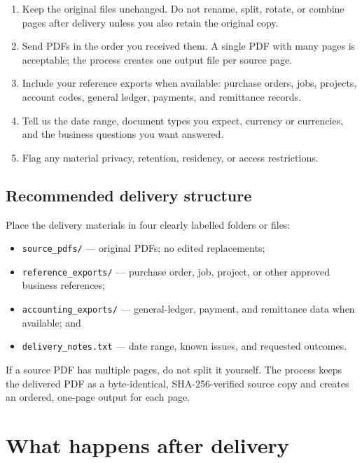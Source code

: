 \documentclass[
]{article}
\providecommand{\tightlist}{%
  \setlength{\itemsep}{0pt}\setlength{\parskip}{0pt}}
\begin{document}
\begin{enumerate}
\def\labelenumi{\arabic{enumi}.}
\tightlist
\item
  Keep the original files unchanged. Do not rename, split, rotate, or
  combine pages after delivery unless you also retain the original copy.
\item
  Send PDFs in the order you received them. A single PDF with many pages
  is acceptable; the process creates one output file per source page.
\item
  Include your reference exports when available: purchase orders, jobs,
  projects, account codes, general ledger, payments, and remittance
  records.
\item
  Tell us the date range, document types you expect, currency or
  currencies, and the business questions you want answered.
\item
  Flag any material privacy, retention, residency, or access
  restrictions.
\end{enumerate}

\subsection{Recommended delivery
structure}\label{recommended-delivery-structure}

Place the delivery materials in four clearly labelled folders or files:

\begin{itemize}
\tightlist
\item
  \texttt{source\_\allowbreak{}pdfs/\allowbreak{}} --- original PDFs; no
  edited replacements;
\item
  \texttt{reference\_\allowbreak{}exports/\allowbreak{}} --- purchase
  order, job, project, or other approved business references;
\item
  \texttt{accounting\_\allowbreak{}exports/\allowbreak{}} ---
  general-ledger, payment, and remittance data when available; and
\item
  \texttt{delivery\_\allowbreak{}notes.txt} --- date range, known
  issues, and requested outcomes.
\end{itemize}

If a source PDF has multiple pages, do not split it yourself. The
process keeps the delivered PDF as a byte-identical, SHA-256-verified
source copy and creates an ordered, one-page output for each page.

\section{What happens after delivery}\label{what-happens-after-delivery}
\end{document}
